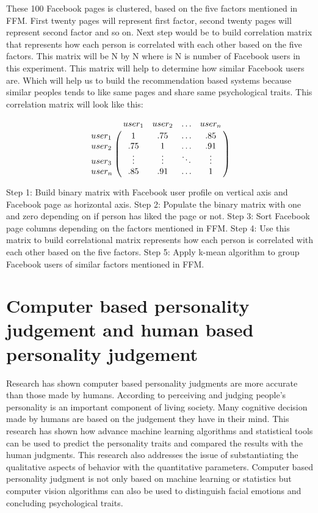 \documentclass[sigconf]{acmart}
\begin{document}
These 100 Facebook pages is clustered, based on the five factors mentioned in FFM. First twenty pages will represent first factor, second twenty pages will represent second factor and so on. Next step would be to build correlation matrix that represents how each person is correlated with each other based on the five factors. This matrix will be N by N where is N is number of Facebook users in this experiment. This matrix will help to determine how similar Facebook users are. Which will help us to build the recommendation based systems because similar peoples tends to like same pages and share same psychological traits. This correlation matrix will look like this:

$$\bordermatrix{\text{}&user_1 &user_2&\ldots &user_n\cr
                user_1&1 &  .75  & \ldots & .85\cr
                user_2& .75  &  1 & \ldots & .91\cr
                user_3& \vdots & \vdots & \ddots & \vdots\cr
                user_n& .85  &   .91       &\ldots & 1}$$               
                

\begin{algorithm}
Step 1: Build binary matrix with Facebook user profile on vertical axis and Facebook page as horizontal axis.
Step 2: Populate the binary matrix with one and zero depending on if person has liked the page or not.
Step 3: Sort Facebook page columns depending on the factors mentioned in FFM. 
Step 4: Use this matrix to build correlational matrix represents how each person is correlated with each other based on the five factors.
Step 5: Apply k-mean algorithm to group Facebook users of similar factors mentioned in FFM. 
\end{algorithm}

\section{Computer based personality judgement and human based personality judgement}
 Research \cite{ref12} has shown computer based personality judgments are more accurate than those made by humans. According to \cite{ref12}  perceiving and judging people’s personality is an important component of living society. Many cognitive decision made by humans are based on the judgement they have in their mind. This research \cite{ref12} has shown how advance machine learning algorithms and statistical tools can be used to predict the personality traits and compared the results with the human judgments. This research also addresses the issue of substantiating the qualitative aspects of behavior with the quantitative parameters. Computer based personality judgment is not only based on machine learning or statistics but computer vision algorithms can also be used to distinguish facial emotions and concluding psychological traits. 
 
\end{document}
